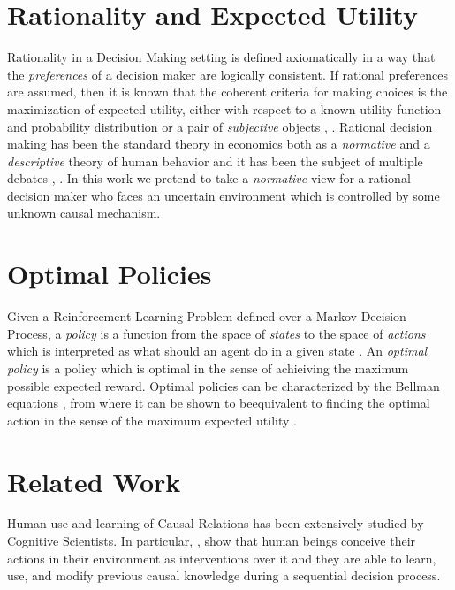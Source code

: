 \documentclass[letterpaper]{article} %
\theoremstyle{plain}
\begin{document}
\section{Rationality and Expected Utility}
Rationality in a Decision Making setting is defined axiomatically in a way that the \textit{preferences} of a decision maker are logically consistent. If rational preferences are assumed, then it is known that the coherent criteria for making choices is the maximization of expected utility, either with respect to a known utility function and probability distribution or a pair of \textit{subjective} objects \cite{bernardo2000bayesian}, \cite{gilboa2009decision}. Rational decision making has been the standard theory in economics both as a \textit{normative} and a \textit{descriptive} theory of human behavior and it has been the subject of multiple debates \cite{tversky1974judgment}, \cite{kahneman1982judgment}. In this work we pretend to take a \textit{normative} view for a rational decision maker who faces an uncertain environment which is controlled by some unknown causal mechanism.

\section{Optimal Policies}
Given a Reinforcement Learning Problem defined over a Markov Decision Process, a \textit{policy} is a function from the space of \textit{states} to the space of \textit{actions} which is interpreted as what should an agent do in a given state \cite{sutton1998reinforcement}. An \textit{optimal policy} is a policy which is optimal in the sense of achieiving the maximum possible expected reward. Optimal policies can be characterized by the Bellman equations \cite{puterman2005markov}, from where it can be shown to beequivalent to finding the optimal action in the sense of the maximum expected utility \cite{webb2007game}.

\section{Related Work}
Human use and learning of Causal Relations has been extensively studied by Cognitive Scientists. In particular, \cite{hagmayer2009decision}, \cite{wellen2012learning} \cite{hagmayer2013repeated} show that human beings conceive their actions in their environment as interventions over it and they are able to learn, use, and modify previous causal knowledge during a sequential decision process.
\end{document}
